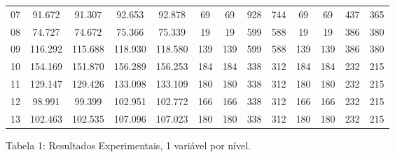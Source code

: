 \documentclass[12pt,a4paper]{article}
\begin{document}
\begin{adjustbox}{width={\textwidth}, totalheight={\textheight}, keepaspectratio}
\begin{tabular}{l cccc cccc cccc}
            07    & 91.672                                     & 91.307                          & 92.653                             & 92.878     & 69  & 69  & 928 & 744        & 69  & 69  & 437 & 365        \\
            08    & 74.727                                     & 74.672                          & 75.366                             & 75.339     & 19  & 19  & 599 & 588        & 19  & 19  & 386 & 380        \\
            09    & 116.292                                    & 115.688                         & 118.930                            & 118.580    & 139 & 139 & 599 & 588        & 139 & 139 & 386 & 380        \\
            10    & 154.169                                    & 151.870                         & 156.289                            & 156.253    & 184 & 184 & 338 & 312        & 184 & 184 & 232 & 215        \\
            11    & 129.147                                    & 129.426                         & 133.098                            & 133.109    & 180 & 180 & 338 & 312        & 180 & 180 & 232 & 215        \\
            12    & 98.991                                     & 99.399                          & 102.951                            & 102.772    & 166 & 166 & 338 & 312        & 166 & 166 & 232 & 215        \\
            13    & 102.463                                    & 102.535                         & 107.096                            & 107.023    & 180 & 180 & 338 & 312        & 180 & 180 & 232 & 215        \\
            \bottomrule
      \end{tabular}
\end{adjustbox}

\vspace*{0.5cm}

\centering
Tabela 1: Resultados Experimentais, 1 variável por nível.

\vspace*{1cm}
\end{document}
